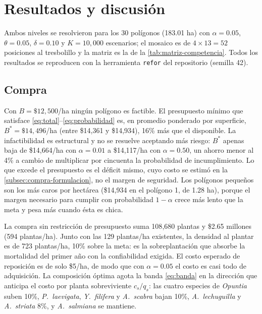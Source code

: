 \section{Resultados y discusión}
\label{sec:resultados}

Ambos niveles se resolvieron para los 30 polígonos (183.01 ha) con $\alpha=0.05$, $\theta=0.05$, $\delta=0.10$ y $K=10{,}000$ escenarios; el mosaico es de $4\times13=52$ posiciones al tresbolillo y la matriz es la de la \cref{tab:matriz-competencia}. Todos los resultados se reproducen con la herramienta \texttt{refor} del repositorio (semilla 42).

\subsection{Compra}
\label{subsec:res-compra}

Con $B=\$12{,}500$/ha ningún polígono es factible. El presupuesto mínimo que satisface \eqref{eq:total}--\eqref{eq:probabilidad} es, en promedio ponderado por superficie, $B^*=\$14{,}496$/ha (entre \$14{,}361 y \$14{,}934), 16\% más que el disponible. La infactibilidad es estructural y no se resuelve aceptando más riesgo: $B^*$ apenas baja de \$14{,}664/ha con $\alpha=0.01$ a \$14{,}117/ha con $\alpha=0.50$, un ahorro menor al 4\% a cambio de multiplicar por cincuenta la probabilidad de incumplimiento. Lo que excede el presupuesto es el déficit mismo, cuyo costo se estimó en la \cref{subsec:compra-formulacion}, no el margen de seguridad. Los polígonos pequeños son los más caros por hectárea (\$14{,}934 en el polígono 1, de 1.28 ha), porque el margen necesario para cumplir con probabilidad $1-\alpha$ crece más lento que la meta y pesa más cuando ésta es chica.

La compra sin restricción de presupuesto suma 108{,}680 plantas y \$2.65 millones (594 plantas/ha). Junto con las 129 plantas/ha existentes, la densidad al plantar es de 723 plantas/ha, 10\% sobre la meta: es la sobreplantación que absorbe la mortalidad del primer año con la confiabilidad exigida. El costo esperado de reposición es de solo \$5/ha, de modo que con $\alpha=0.05$ el costo es casi todo de adquisición. La composición óptima agota la banda \eqref{eq:banda} en la dirección que anticipa el costo por planta sobreviviente $c_s/q_s$: las cuatro especies de \textit{Opuntia} suben 10\%, \textit{P.~laevigata}, \textit{Y.~filifera} y \textit{A.~scabra} bajan 10\%, \textit{A.~lechuguilla} y \textit{A.~striata} 8\%, y \textit{A.~salmiana} se mantiene.

